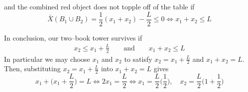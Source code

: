 \begin{itemize}
\begin{itemize}
and the combined red object does not topple off of the table if
\begin{equation*}
\bar X(B_1\cup B_2)
=\frac{1}{2}(x_1+x_2) -\frac{L}{2} \le 0
\iff
x_1+x_2\le L
\end{equation*}
\end{itemize}
In conclusion, our two--book tower survives if
\begin{align*}
x_2\le x_1+\frac{L}{2}\qquad\text{and}\qquad x_1+x_2\le L
\end{align*}
In particular we may choose $x_1$ and $x_2$ to satisfy
$x_2 = x_1+\frac{L}{2}$ and $x_1+x_2 = L$. Then, substituting
$x_2 = x_1+\frac{L}{2}$ into $x_1+x_2 = L$ gives
\begin{equation*}
x_1 + \Big(x_1+\frac{L}{2}\Big) = L
\iff 2x_1 = \frac{L}{2}
\iff x_1 = \frac{L}{2}\Big(\frac{1}{2}\Big),\quad
     x_2 = \frac{L}{2}\Big(1+\frac{1}{2}\Big)
\end{equation*}


\end{itemize}

